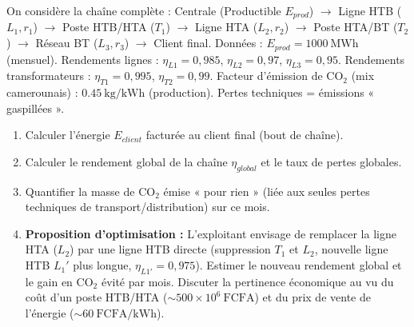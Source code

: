 \documentclass[11pt]{article}
\begin{document}
\begin{exercice}
On considère la chaîne complète : Centrale (Productible $E_{prod}$) $\to$ Ligne HTB ($L_1, r_1$) $\to$ Poste HTB/HTA ($T_1$) $\to$ Ligne HTA ($L_2, r_2$) $\to$ Poste HTA/BT ($T_2$) $\to$ Réseau BT ($L_3, r_3$) $\to$ Client final.
Données : $E_{prod} = \SI{1000}{\mega\watt\hour}$ (mensuel). Rendements lignes : $\eta_{L1}=0,985$, $\eta_{L2}=0,97$, $\eta_{L3}=0,95$. Rendements transformateurs : $\eta_{T1}=0,995$, $\eta_{T2}=0,99$. Facteur d'émission de CO$_2$ (mix camerounais) : $\SI{0,45}{\kilo\gram\per\kilo\watt\hour}$ (production). Pertes techniques = émissions « gaspillées ».
\begin{enumerate}
    \item Calculer l'énergie $E_{client}$ facturée au client final (bout de chaîne).
    \item Calculer le rendement global de la chaîne $\eta_{global}$ et le taux de pertes globales.
    \item Quantifier la masse de CO$_2$ émise « pour rien » (liée aux seules pertes techniques de transport/distribution) sur ce mois.
    \item \textbf{Proposition d'optimisation :} L'exploitant envisage de remplacer la ligne HTA ($L_2$) par une ligne HTB directe (suppression $T_1$ et $L_2$, nouvelle ligne HTB $L_1'$ plus longue, $\eta_{L1'}=0,975$). Estimer le nouveau rendement global et le gain en CO$_2$ évité par mois. Discuter la pertinence économique au vu du coût d'un poste HTB/HTA ($\sim 500 \times 10^6~\text{FCFA}$) et du prix de vente de l'énergie ($\sim \SI{60}{\text{FCFA}\per\kilo\watt\hour}$).
\end{enumerate}
\end{exercice}
\end{document}
